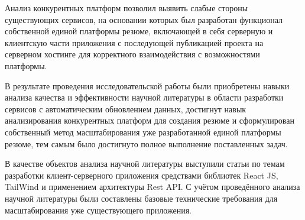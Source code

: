 \documentclass[master, och, diploma]{SCWorks}
\begin{document}
Анализ конкурентных платформ позволил выявить слабые стороны существующих сервисов, 
на основании которых был разработан функционал собственной единой платформы 
резюме, включающей в себя серверную и клиентскую части приложения с последующей
публикацией проекта на серверном хостинге для корректного взаимодействия 
с возможностями платформы.


В результате проведения исследовательской работы были приобретены навыки анализа качества и эффективности научной литературы в области разработки сервисов с автоматическим обновлением данных, достигнут навык анализирования конкурентных платформ для создания резюме и сформулирован собственный метод масштабирования уже разработанной единой платформы резюме, тем самым было достигнуто полное выполнение поставленных задач. 

В качестве объектов анализа научной литературы выступили статьи по темам разработки клиент-серверного приложения средствами библиотек React JS, TailWind и применением архитектуры Rest API. С учётом проведённого анализа научной литературы были составлены базовые технические требования для масштабирования уже существующего приложения.



%







\appendix
\end{document}
